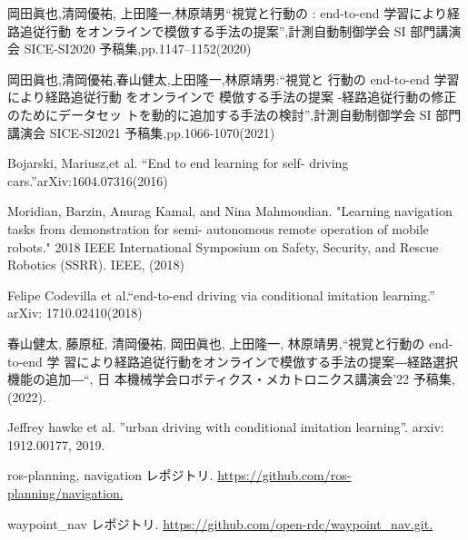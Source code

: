 \documentclass{jarticle}
\begin{document}
\footnotesize
\begin{thebibliography}{99}



岡田眞也,清岡優祐, 上田隆一,林原靖男“視覚と行動の : end-to-end 学習により経路追従行動 をオンラインで模倣する手法の提案”,計測自動制御学会 SI 部門講演会 SICE-SI2020 予稿集,pp.1147–1152(2020)

岡田眞也,清岡優祐,春山健太,上田隆一,林原靖男:“視覚と 行動の end-to-end 学習により経路追従行動 をオンラインで 模倣する手法の提案 -経路追従行動の修正のためにデータセッ トを動的に追加する手法の検討”,計測自動制御学会 SI 部門 講演会 SICE-SI2021 予稿集,pp.1066-1070(2021)

Bojarski, Mariusz,et al. “End to end learning for self- driving cars.”arXiv:1604.07316(2016)

Moridian, Barzin, Anurag Kamal, and Nina Mahmoudian. "Learning navigation tasks from demonstration for semi- autonomous remote operation of mobile robots." 2018 IEEE International Symposium on Safety, Security, and Rescue Robotics (SSRR). IEEE, (2018)

Felipe Codevilla et al.“end-to-end driving via conditional imitation learning.” arXiv: 1710.02410(2018)

春山健太, 藤原柾, 清岡優祐, 岡田眞也, 上田隆一, 林原靖男,“視覚と行動の end-to-end 学 習により経路追従行動をオンラインで模倣する手法の提案―経路選択機能の追加―“, 日 本機械学会ロボティクス・メカトロニクス講演会’22 予稿集,(2022).

Jeffrey hawke et al. ”urban driving with conditional imitation learning”. arxiv: 1912.00177, 2019.

ros-planning, navigation レポジトリ. \url{https://github.com/ros-planning/navigation.}

waypoint\_nav レポジトリ. \url{https://github.com/open-rdc/waypoint_nav.git.}

\end{thebibliography}

\normalsize
\end{document}
